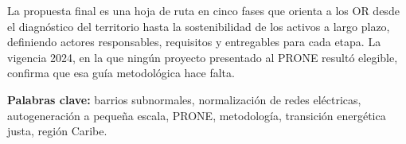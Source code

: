 La propuesta final es una hoja de ruta en cinco fases que orienta a los OR desde el diagnóstico del territorio hasta la sostenibilidad de los activos a largo plazo, definiendo actores responsables, requisitos y entregables para cada etapa. La vigencia 2024, en la que ningún proyecto presentado al PRONE resultó elegible, confirma que esa guía metodológica hace falta.

\bigskip
\noindent\textbf{Palabras clave:} barrios subnormales, normalización de redes eléctricas, autogeneración a pequeña escala, PRONE, metodología, transición energética justa, región Caribe.
